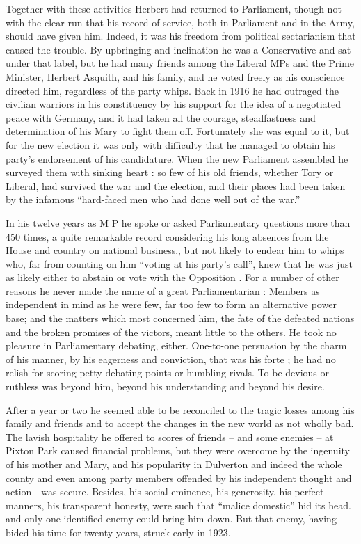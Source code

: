 Together with these activities Herbert had returned to Parliament, though not with the clear run that his record of service, both in Parliament and in the Army, should have given him. Indeed, it was his freedom from political sectarianism that caused the trouble. By upbringing and inclination he was a Conservative and sat under that label, but he had many friends among the Liberal MPs and the Prime Minister, Herbert Asquith, and his family, and he voted freely as his conscience directed him, regardless of the party whips. Back in 1916 he had outraged the civilian warriors in his constituency by his support for the idea of a negotiated peace with Germany, and it had taken all the courage, steadfastness and determination of his Mary to fight them off. Fortunately she was equal to it, but for the new election it was only with difficulty that he managed to obtain his party’s endorsement of his candidature. When the new Parliament assembled he surveyed them with sinking heart : so few of his old friends, whether Tory or Liberal, had survived the war and the election, and their places had been taken by the infamous “hard-faced men who had done well out of the war.” 

In his twelve years as M P he spoke or asked Parliamentary questions more than 450 times, a quite remarkable record considering his long absences from the House and country on national business., but not likely to endear him to whips who, far from counting on him “voting at his party’s call”, knew that he was just as likely either to abstain or vote with the Opposition . For a number of other reasons he never made the name of a great Parliamentarian : Members as independent in mind as he were few, far too few to form an alternative power base; and the matters which most concerned him, the fate of the defeated nations and the broken promises of the victors, meant little to the others. He took no pleasure in Parliamentary debating, either. One-to-one persuasion by the charm of his manner, by his eagerness and conviction, that was his forte ; he had no relish for scoring petty debating points or humbling rivals. To be devious or ruthless was beyond him, beyond his understanding and beyond his desire. 

After a year or two he seemed able to be reconciled to the tragic losses among his family and friends and to accept the changes in the new world as not wholly bad. The lavish hospitality he offered to scores of friends – and some enemies – at Pixton Park caused financial problems, but they were overcome by the ingenuity of his mother and Mary, and his popularity in Dulverton and indeed the whole county and even among party members offended by his independent thought and action - was secure. Besides, his social eminence, his generosity, his perfect manners, his transparent honesty, were such that “malice domestic” hid its head. and only one identified enemy could bring him down. But that enemy, having bided his time for twenty years, struck early in 1923.

